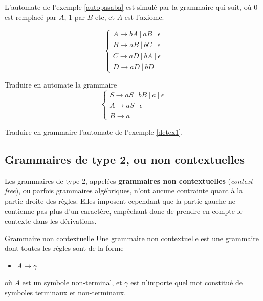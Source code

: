 \begin{example}
L'automate de l'exemple \ref{autopasaba} est simulé par la grammaire qui suit, où $0$ est remplacé par $A$, $1$ par $B$ etc, et $A$ est l'axiome.

\[
\begin{cases}
A \rightarrow bA~|~aB~|~ \epsilon \\
B \rightarrow aB~|~bC~|~ \epsilon \\
C \rightarrow aD~|~bA~|~ \epsilon \\
D \rightarrow aD~|~bD
\end{cases}
\]

\end{example}

\begin{exercice}
Traduire en automate la grammaire 
\[
\begin{cases}
S \rightarrow aS~|~bB~|~a~|~\epsilon \\
A \rightarrow aS~|~\epsilon \\
B \rightarrow a
\end{cases}
\]

\end{exercice}

\begin{exercice}
Traduire en grammaire l'automate de l'exemple \ref{detex1}.
\end{exercice}



\subsection{Grammaires de type 2, ou non contextuelles}

Les grammaires de type 2, appelées \textbf{grammaires non contextuelles} (\textit{context-free}), ou parfois grammaires algébriques, n'ont aucune contrainte quant à la partie droite des règles. Elles imposent cependant que la partie gauche ne contienne pas plus d'un caractère, empêchant donc de prendre en compte le contexte dans les dérivations.

\begin{definition}{Grammaire non contextuelle}{}
Une grammaire non contextuelle est une grammaire dont toutes les règles sont de la forme 
\begin{itemize}
\item[] $A \rightarrow \gamma$
\end{itemize}
où $A$ est un symbole non-terminal, et $\gamma$ est n'importe quel mot constitué de symboles terminaux et non-terminaux.
\end{definition}

